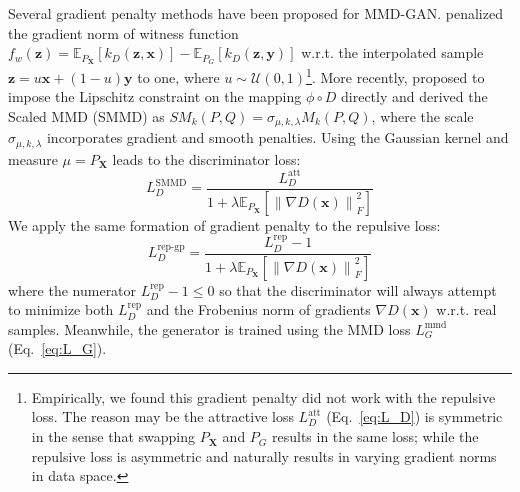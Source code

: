 \documentclass{article} %
\theoremstyle{plain}
\newtheorem*{proposition 1*}{Proposition 1}
\newcommand\norm[1]{\left\lVert#1\right\rVert}
\newcommand{\ds}[1]{\mathcal{#1}}  %
\newcommand{\set}[1]{\mathbb{#1}}  %
\newcommand{\rdv}[1]{\mathbf{#1}}  %
\begin{document}
\begin{appendices}
Several gradient penalty methods have been proposed for MMD-GAN. \cite{mmd_gan_t} penalized the gradient norm of witness function \(f_w(\bm{z})=\set{E}_{P_{\rdv{X}}}[k_D(\bm{z},\bm{x})]-\set{E}_{P_G}[k_D(\bm{z},\bm{y})]\) w.r.t. the interpolated sample \(\bm{z}=u\bm{x}+(1-u)\bm{y}\) to one, where \(u\sim\ds{U}(0,1)\)\footnote{Empirically, we found this gradient penalty did not work with the repulsive loss. The reason may be the attractive loss \(L_D^{\text{att}}\) (Eq.~\ref{eq:L_D}) is symmetric in the sense that swapping \(P_{\rdv{X}}\) and \(P_{G}\) results in the same loss; while the repulsive loss is asymmetric and naturally results in varying gradient norms in data space.}.
More recently, \cite{mmd_gp} proposed to impose the Lipschitz constraint on the mapping \(\phi \circ D\) directly and derived the Scaled MMD (SMMD) as \(SM_k(P,Q)=\sigma_{\mu,k,\lambda}M_k(P,Q)\), where the scale \(\sigma_{\mu,k,\lambda}\) incorporates gradient and smooth penalties. Using the Gaussian kernel and measure \(\mu=P_{\rdv{X}}\) leads to the discriminator loss:
\begin{equation}\label{eq:smmd}
	L_D^{\text{SMMD}}=\frac{L_D^{\text{att}}}{1+\lambda\set{E}_{P_{\rdv{X}}}[\norm{\nabla D(\bm{x})}_F^2]}
\end{equation}
We apply the same formation of gradient penalty to the repulsive loss:
\begin{equation}\label{eq:rep_gp}
	L_{D}^{\text{rep-gp}}=\frac{L_{D}^{\text{rep}}-1}{1+\lambda\set{E}_{P_{\rdv{X}}}[\norm{\nabla D(\bm{x})}_F^2]}
\end{equation}
where the numerator \(L_{D}^{\text{rep}}-1\le0\) so that the discriminator will always attempt to minimize both \(L_{D}^{\text{rep}}\) and the Frobenius norm of gradients \(\nabla D(\bm{x})\) w.r.t. real samples. Meanwhile, the generator is trained using the MMD loss \(L_{G}^{\text{mmd}}\) (Eq.~\ref{eq:L_G}).


\end{appendices}
\end{document}
